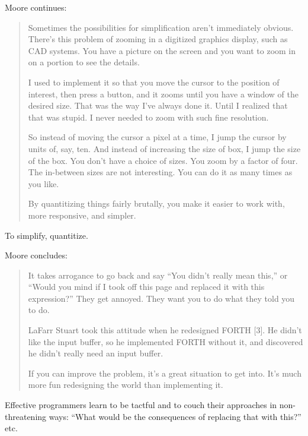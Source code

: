 


\blackline{2ex}
\noindent Moore continues:

\begin{quotation}
\noindent Sometimes the possibilities for simplification aren't immediately obvious.
There's this problem of zooming in a digitized graphics display, such as
CAD systems. You have a picture on the screen and you want to zoom in on
a portion to see the details.

I used to implement it so that you move the cursor to the position of
interest, then press a button, and it zooms until you have a window of the
desired size. That was the way I've always done it. Until I realized that that
was stupid. I never needed to zoom with such fine resolution.

So instead of moving the cursor a pixel at a time, I jump the cursor by units
of, say, ten. And instead of increasing the size of box, I jump the size of the
box. You don't have a choice of sizes. You zoom by a factor of four. The
in-between sizes are not interesting. You can do it as many times as you
like.

By quantitizing things fairly brutally, you make it easier to work with,
more responsive, and simpler.
\end{quotation}
\blackline{2ex}

\begin{tip}
To simplify, quantitize.
\end{tip}

\blackline{2ex}
\noindent Moore concludes:
\begin{quotation}
\noindent It takes arrogance to go back and say ``You didn't really mean this,'' or
``Would you mind if I took off this page and replaced it with this
expression?'' They get annoyed. They want you to do what they told you to do.

LaFarr Stuart took this attitude when he redesigned FORTH {[}3{]}. He didn't
like the input buffer, so he implemented FORTH without it, and discovered
he didn't really need an input buffer.

If you can improve the problem, it's a great situation to get into. It's much
more fun redesigning the world than implementing it.
\end{quotation}
\blackline{2ex}

\noindent Effective programmers learn to be tactful and to couch their approaches
in non-threatening ways: ``What would be the consequences of replacing
that with this?'' etc.

